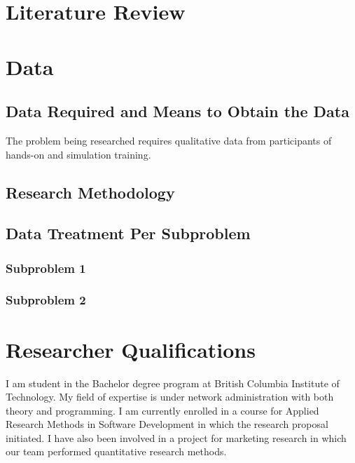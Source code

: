 \documentclass[titlepage]{article}
\begin{document}
\clearpage

\section{Literature Review}

\clearpage

\section{Data}

\subsection{Data Required and Means to Obtain the Data}
The problem being researched requires qualitative data from participants of hands-on
and simulation training.  

\subsection{Research Methodology}

\subsection{Data Treatment Per Subproblem}

\subsubsection{Subproblem 1}

\subsubsection{Subproblem 2}

\clearpage

\section{Researcher Qualifications}
I am student in the Bachelor degree program at British Columbia Institute of Technology.
My field of expertise is under network administration with both theory and programming.
I am currently enrolled in a course for Applied Research Methods in Software Development
in which the research proposal initiated.  I have also been involved in a project for
marketing research in which our team performed quantitative research methods.

\clearpage
\end{document}
